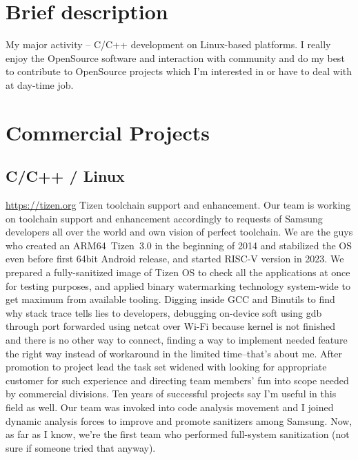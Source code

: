 \documentclass[11pt,a4paper]{moderncv}
\begin{document}
\maketitle

\section{Brief description}
\cvitem {} {My major activity -- C/C++ development on Linux-based platforms.\newline{} I really enjoy the OpenSource
  software and interaction with community and do my best to contribute to OpenSource projects which I'm interested in or
  have to deal with at day-time job.}
\section{Commercial Projects}
  \subsection{C/C++ / Linux}
  {\url{https://tizen.org}\newline{}
    Tizen toolchain support and enhancement.\newline{}
    Our team is working on toolchain support and enhancement accordingly to requests of Samsung developers all over the
    world and own vision of perfect toolchain. We are the guys who created an ARM64~Tizen~3.0 in the beginning of 2014
    and stabilized the OS even before first 64bit Android release, and started RISC-V version in 2023.\newline{}
    We prepared a fully-sanitized image of Tizen OS to check all the applications at once for testing purposes, and
    applied binary watermarking technology system-wide to get maximum from available tooling.\newline{}
    Digging inside GCC and Binutils to find why stack trace tells lies to developers, debugging on-device soft using gdb
    through port forwarded using netcat over Wi-Fi because kernel is not finished and there is no other way to connect,
    finding a way to implement needed feature the right way instead of workaround in the limited time--that's about me.
    \newline{}
    After promotion to project lead the task set widened with looking for appropriate customer for such experience
    and directing team members' fun into scope needed by commercial divisions. Ten years of successful projects say
    I'm useful in this field as well.\newline{}
    Our team was invoked into code analysis movement and I joined dynamic analysis forces to improve and promote sanitizers
    among Samsung. Now, as far as I know, we're the first team who performed full-system sanitization (not sure if someone
    tried that anyway).
  }
\end{document}
